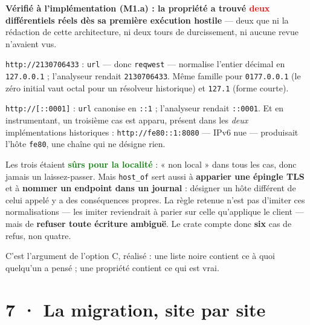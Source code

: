 \documentclass[10pt]{article}
\newcommand{\best}[1]{\textcolor{green}{\textbf{#1}}}
\newcommand{\pire}[1]{\textcolor{red}{\textbf{#1}}}
\newcommand{\code}[1]{\texttt{\small #1}}
\begin{document}
\begin{alerte}
\textbf{Vérifié à l'implémentation (M1.a) : la propriété a trouvé \pire{deux} différentiels réels
dès sa première exécution hostile} --- deux que ni la rédaction de cette architecture, ni deux tours
de durcissement, ni aucune revue n'avaient vus.

\smallskip
\code{http://2130706433} : \code{url} --- donc \code{reqwest} --- normalise l'entier décimal en
\code{127.0.0.1} ; l'analyseur rendait \code{2130706433}. Même famille pour \code{0177.0.0.1} (le
zéro initial vaut octal pour un résolveur historique) et \code{127.1} (forme courte).

\smallskip
\code{http://[::0001]} : \code{url} canonise en \code{::1} ; l'analyseur rendait \code{::0001}. Et
en instrumentant, un troisième cas est apparu, présent dans les \emph{deux} implémentations
historiques : \code{http://fe80::1:8080} --- IPv6 nue --- produisait l'hôte \code{fe80}, une chaîne
qui ne désigne rien.

\smallskip
Les trois étaient \best{sûrs pour la localité} : « non local » dans tous les cas, donc jamais un
laissez-passer. Mais \code{host\_of} sert aussi à \textbf{apparier une épingle TLS} et à
\textbf{nommer un endpoint dans un journal} : désigner un hôte différent de celui appelé y a des
conséquences propres. La règle retenue n'est pas d'imiter ces normalisations --- les imiter
reviendrait à parier sur celle qu'applique le client --- mais de \textbf{refuser toute écriture
ambiguë}. Le crate compte donc \textbf{six} cas de refus, non quatre.

\smallskip
C'est l'argument de l'option C, réalisé : une liste noire contient ce à quoi quelqu'un a pensé ;
une propriété contient ce qui est vrai.
\end{alerte}

\section{7 · La migration, site par site}
\end{document}
